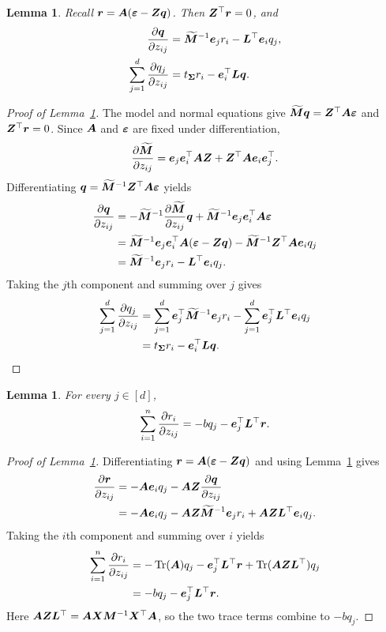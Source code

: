 \documentclass{article}
\theoremstyle{plain} %
\newtheorem{lemma}[theorem]{Lemma}
\theoremstyle{definition} %
\theoremstyle{definition} %
\begin{document}
\begin{lemma}\label{lem:dot-beta}
Recall $\br=\bA(\bep-\bZ\bq)$.  Then $\bZ^\top\br=0$, and
\begin{align*}
    \pdv{\bq}{z_{ij}}
    &=\widetilde{\bM}^{-1}\be_jr_i-\bL^\top\be_iq_j,\\
    \sum_{j=1}^d\pdv{q_j}{z_{ij}}
    &=t_{\bSigma}r_i-\be_i^\top\bL\bq.
\end{align*}
\end{lemma}

\begin{proof}[Proof of Lemma~\ref{lem:dot-beta}]
The model and normal equations give
$\widetilde{\bM}\bq=\bZ^\top\bA\bep$ and $\bZ^\top\br=0$.
Since $\bA$ and $\bep$ are fixed under differentiation,
\begin{align*}
    \pdv{\widetilde{\bM}}{z_{ij}}
    =\be_j\be_i^\top\bA\bZ+\bZ^\top\bA\be_i\be_j^\top.
\end{align*}
Differentiating $\bq=\widetilde{\bM}^{-1}\bZ^\top\bA\bep$ yields
\begin{align*}
    \pdv{\bq}{z_{ij}}
    &=-\widetilde{\bM}^{-1}
       \pdv{\widetilde{\bM}}{z_{ij}}\bq
       +\widetilde{\bM}^{-1}\be_j\be_i^\top\bA\bep\\
    &=\widetilde{\bM}^{-1}\be_j
       \be_i^\top\bA(\bep-\bZ\bq)
       -\widetilde{\bM}^{-1}\bZ^\top\bA\be_iq_j\\
    &=\widetilde{\bM}^{-1}\be_jr_i-\bL^\top\be_iq_j.
\end{align*}
Taking the $j$th component and summing over $j$ gives
\begin{align*}
    \sum_{j=1}^d\pdv{q_j}{z_{ij}}
    &=\sum_{j=1}^d\be_j^\top\widetilde{\bM}^{-1}\be_jr_i
       -\sum_{j=1}^d\be_j^\top\bL^\top\be_iq_j\\
    &=t_{\bSigma}r_i-\be_i^\top\bL\bq.
\end{align*}
\end{proof}

\begin{lemma}\label{lem:dot-r}
For every $j\in[d]$,
\begin{align*}
    \sum_{i=1}^n\pdv{r_i}{z_{ij}}
    =-bq_j-\be_j^\top\bL^\top\br.
\end{align*}
\end{lemma}

\begin{proof}[Proof of Lemma~\ref{lem:dot-r}]
Differentiating $\br=\bA(\bep-\bZ\bq)$ and using
Lemma~\ref{lem:dot-beta} gives
\begin{align*}
    \pdv{\br}{z_{ij}}
    &=-\bA\be_iq_j-\bA\bZ\pdv{\bq}{z_{ij}}\\
    &=-\bA\be_iq_j
       -\bA\bZ\widetilde{\bM}^{-1}\be_jr_i
       +\bA\bZ\bL^\top\be_iq_j.
\end{align*}
Taking the $i$th component and summing over $i$ yields
\begin{align*}
    \sum_{i=1}^n\pdv{r_i}{z_{ij}}
    &=-\trace(\bA)q_j-\be_j^\top\bL^\top\br
       +\trace(\bA\bZ\bL^\top)q_j\\
    &=-bq_j-\be_j^\top\bL^\top\br.
\end{align*}
Here
$\bA\bZ\bL^\top=\bA\bX\bM^{-1}\bX^\top\bA$,
so the two trace terms combine to $-bq_j$.
\end{proof}
\end{document}
